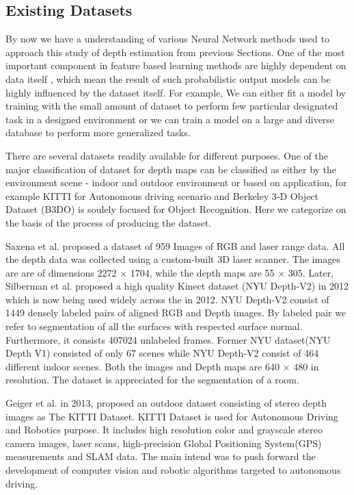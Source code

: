 \subsection{Existing Datasets}

By now we have a understanding of various Neural Network methods used to approach this study of depth estimation from previous Sections. One of the most important component in feature based learning methods are highly dependent on data itself \cite{friedman2001elements}, which mean the result of such probabilistic output models can be highly influenced by the dataset itself. For example, We can either fit a model by training with the small amount of dataset to perform few particular designated task in a designed environment or we can train a model on a large and diverse database to perform more generalized tasks.

There are several datasets readily available for different purposes. One of the major classification of dataset for depth maps can be classified as either by the environment scene - indoor and outdoor environment or based on application, for example KITTI for Autonomous driving \cite{Geiger2013IJRR} scenario and Berkeley 3-D Object Dataset (B3DO) \cite{Janoch:EECS-2012-85} is soulely focused for Object Recognition. Here we categorize on the basis of the process of producing the dataset.

Saxena et al. \cite{saxena2006learning} proposed a dataset of 959 Images of RGB and laser range data. All the depth data was collected using a custom-built 3D laser scanner. The images are are of dimensions 2272 $\times$ 1704, while the depth maps are 55 $\times$ 305. Later, Silberman et al. \cite{Silberman:ECCV12} proposed a high quality Kinect dataset (NYU Depth-V2) in 2012 which is now being used widely across the in 2012. NYU Depth-V2 \cite{Silberman:ECCV12} consist of 1449 densely labeled pairs of aligned RGB and Depth images. By labeled pair we refer to segmentation of all the surfaces with respected surface normal. Furthermore, it consists 407024 unlabeled frames. Former NYU dataset(NYU Depth V1) \cite{silberman11indoor} consisted of only 67 scenes while NYU Depth-V2 consist of 464 different indoor scenes. Both the images and Depth maps are 640 $\times$ 480 in resolution. The dataset is appreciated for the segmentation of a room.

Geiger et al. \cite{Geiger2013IJRR} in 2013, proposed an outdoor dataset consisting of stereo depth images as The KITTI Dataset. KITTI Dataset is used for Autonomous Driving and Robotics purpose. It includes high resolution color and grayscale stereo camera images, laser scans, high-precision Global Positioning System(GPS) measurements and SLAM data. The main intend was to push forward the development of computer vision and robotic algorithms targeted to autonomous driving.

